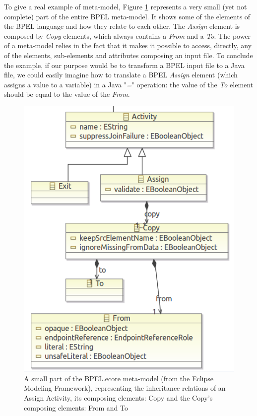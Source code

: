To give a real example of meta-model, Figure \ref{BPELEcoreExample} represents a very small (yet not complete) part of the entire BPEL meta-model. It shows some of the elements of the BPEL language and how they relate to each other. The \textit{Assign} element is composed by \textit{Copy} elements, which always contains a \textit{From} and a \textit{To}. The power of a meta-model relies in the fact that it makes it possible to access, directly, any of the elements, sub-elements and attributes composing an input file. To conclude the example, if our purpose would be to transform a BPEL input file to a Java file, we could easily imagine how to translate a BPEL \textit{Assign} element (which assigns a value to a variable) in a Java "\textit{=}" operation: the value of the \textit{To} element should be equal to the value of the \textit{From}. 

\begin{figure}
  \begin{center}
    \includegraphics[scale=0.5]{pictures/BPELMetaModelExample.png}
    \caption{A small part of the BPEL.ecore meta-model (from the Eclipse Modeling Framework), representing the inheritance relations of an Assign Activity, its composing elements: Copy and the Copy's composing elements: From and To}
    \label{BPELEcoreExample}
  \end{center}
\end{figure}


